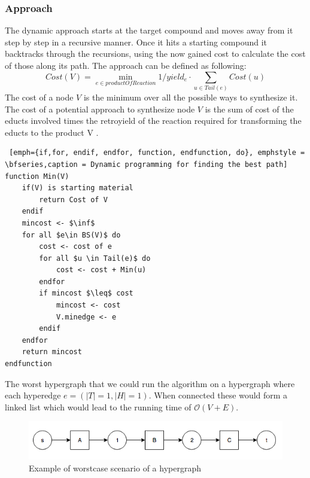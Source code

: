 \documentclass[a4paper,10pt,titlepage]{paper}
\begin{document}
\subsubsection{Approach}
The dynamic approach starts at the target compound and moves away from it step by step in a recursive manner. Once it hits a starting compound it backtracks through the recursions, using the now gained cost to calculate the cost of those along its path. The approach can be defined as following:
\begin{equation}
Cost(V) = \displaystyle\min_{e\in productOfReaction} 1/yield_e \cdot \displaystyle\sum_{u\in Tail(e)} Cost(u)
\end{equation}
The cost of a node $V$ is the minimum over all the possible ways to synthesize it. The cost of a potential approach to synthesize node $V$ is the sum of cost of the educts involved times the retroyield of the reaction required for transforming the educts to the product V .\cite{Carsten}
	
\begin{lstlisting} [emph={if,for, endif, endfor, function, endfunction, do}, emphstyle = \bfseries,caption = Dynamic programming for finding the best path]
function Min(V)
	if(V) is starting material 
		return Cost of V
	endif
	mincost <- $\inf$
	for all $e\in BS(V)$ do
		cost <- cost of e
		for all $u \in Tail(e)$ do
			cost <- cost + Min(u)
		endfor
		if mincost $\leq$ cost 
			mincost <- cost
			V.minedge <- e
		endif
	endfor
	return mincost
endfunction
\end{lstlisting}

The worst hypergraph that we could run the algorithm on a hypergraph where each hyperedge $e=(|T| = 1, |H| = 1)$. When connected these would form a linked list which would lead to the running time of $\mathcal{O}(V+E)$. 
\begin{figure}[H]
\centering
\includegraphics[scale=0.5]{Billeder/WorstCaseDynamic.png}
\caption{Example of worstcase scenario of a hypergraph}
\end{figure}
\end{document}
